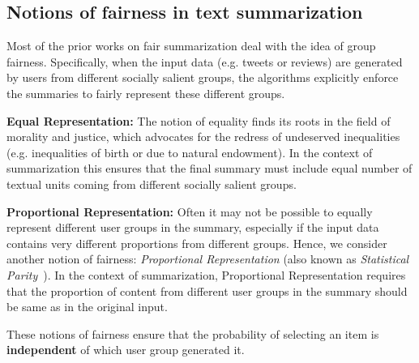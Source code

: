 
\subsection{Notions of fairness in text summarization} \label{sub:fairness-notions}
\noindent
Most of the prior works on fair summarization deal with the idea of group fairness. Specifically, when the input data (e.g. tweets or reviews) are generated by users from different socially salient groups, the algorithms explicitly enforce the summaries to fairly represent these different groups. 

\vspace{2mm}
\noindent
\textbf{Equal Representation:} The notion of equality finds its roots in the field of morality and justice, which advocates for the redress of undeserved inequalities (e.g. inequalities of birth or due to natural endowment)\cite{rawls2009theory}. In the context of summarization this ensures that the final summary must include equal number of textual units coming from different socially salient groups.

\vspace{2mm}
\noindent
\textbf{Proportional Representation:} Often it may not be possible to equally  represent different user groups in the summary, especially if the input data contains very different proportions from different groups. 
Hence, we consider another notion of fairness: {\it Proportional Representation} (also known as \textit{Statistical Parity}~\cite{luong2011k}).
In the context of summarization, Proportional Representation requires that the proportion of content from different user groups in the summary should be  same as in the original input. 


\noindent These notions of fairness ensure that the probability of selecting an item is \textbf{independent} of which user group generated it.

